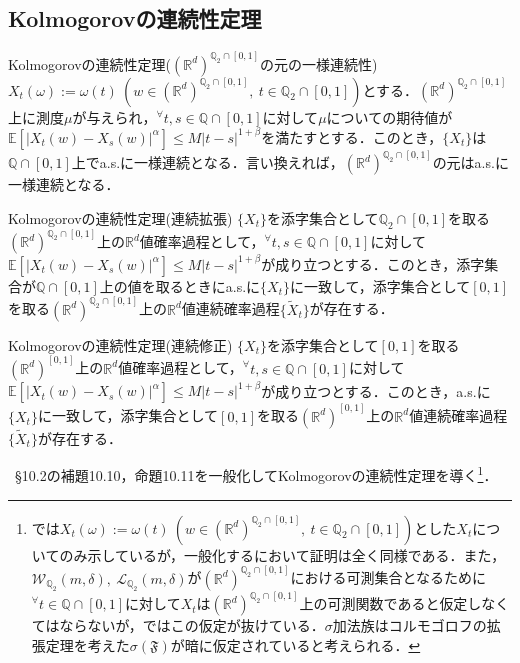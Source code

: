 \documentclass[dvipdfmx]{jsarticle}
\begin{document}
\subsection{Kolmogorovの連続性定理}
\begin{itembox}[l]{Kolmogorovの連続性定理($(\mathbb{R}^d)^{\mathbb{Q}_2\cap [0,1]}$の元の一様連続性)}
$X_t(\omega):=\omega(t){\ }(w\in(\mathbb{R}^d)^{\mathbb{Q}_2\cap [0,1]},{\ }t\in\mathbb{Q}_2\cap [0,1])$とする．$(\mathbb{R}^d)^{\mathbb{Q}_2\cap [0,1]}$上に測度$\mu$が与えられ，$^\forall t,s\in\mathbb{Q}\cap [0,1]$に対して$\mu$についての期待値が$\mathbb{E}[|X_t(w)-X_s(w)|^\alpha]\leq M|t-s|^{1+\beta}$を満たすとする．このとき，$\{X_t\}$は$\mathbb{Q}\cap [0,1]$上でa.s.に一様連続となる．言い換えれば，$(\mathbb{R}^d)^{\mathbb{Q}_2\cap [0,1]}$の元はa.s.に一様連続となる．
\end{itembox}
\begin{itembox}[l]{Kolmogorovの連続性定理(連続拡張)}
$\{X_t\}$を添字集合として$\mathbb{Q}_2\cap [0,1]$を取る$(\mathbb{R}^d)^{\mathbb{Q}_2\cap [0,1]}$上の$\mathbb{R}^d$値確率過程として，$^\forall t,s\in\mathbb{Q}\cap [0,1]$に対して$\mathbb{E}[|X_t(w)-X_s(w)|^\alpha]\leq M|t-s|^{1+\beta}$が成り立つとする．このとき，添字集合が$\mathbb{Q}\cap [0,1]$上の値を取るときにa.s.に$\{X_t\}$に一致して，添字集合として$[0,1]$を取る$(\mathbb{R}^d)^{\mathbb{Q}_2\cap [0,1]}$上の$\mathbb{R}^d$値連続確率過程$\{\widetilde{X}_t\}$が存在する．
\end{itembox}
\begin{itembox}[l]{Kolmogorovの連続性定理(連続修正)}
$\{X_t\}$を添字集合として$[0,1]$を取る$(\mathbb{R}^d)^{[0,1]}$上の$\mathbb{R}^d$値確率過程として，$^\forall t,s\in\mathbb{Q}\cap [0,1]$に対して$\mathbb{E}[|X_t(w)-X_s(w)|^\alpha]\leq M|t-s|^{1+\beta}$が成り立つとする．このとき，a.s.に$\{X_t\}$に一致して，添字集合として$[0,1]$を取る$(\mathbb{R}^d)^{[0,1]}$上の$\mathbb{R}^d$値連続確率過程$\{\widetilde{X}_t\}$が存在する．
\end{itembox}
%
\cite{kotani}{\ }\S 10.2の補題10.10，命題10.11を一般化してKolmogorovの連続性定理を導く\footnote{\cite{kotani}では$X_t(\omega):=\omega(t){\ }(w\in(\mathbb{R}^d)^{\mathbb{Q}_2\cap [0,1]},{\ }t\in\mathbb{Q}_2\cap [0,1])$とした$X_t$についてのみ示しているが，一般化するにおいて証明は全く同様である．また，$\mathcal{W}_{\mathbb{Q}_2}(m,\delta),{\ }\mathcal{L}_{\mathbb{Q}_2}(m,\delta)$が$(\mathbb{R}^d)^{\mathbb{Q}_2\cap [0,1]}$における可測集合となるために$^\forall t\in \mathbb{Q}\cap [0,1]$に対して$X_t$は$(\mathbb{R}^d)^{\mathbb{Q}_2\cap [0,1]}$上の可測関数であると仮定しなくてはならないが，\cite{kotani}ではこの仮定が抜けている．$\sigma$加法族はコルモゴロフの拡張定理を考えた$\sigma(\mathfrak{F})$が暗に仮定されていると考えられる．}．
\end{document}
